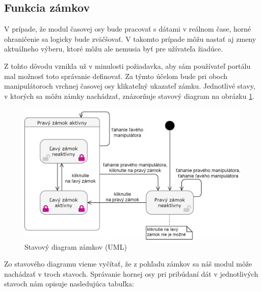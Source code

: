 \documentclass[
  digital, %
  twoside, %
  notable,   %
  nolof,   %
  nolot,   %
]{fithesis3}
\begin{document}
\subsection{Funkcia zámkov}
\label{sec:lockers}
V prípade, že modul časovej osy bude pracovať s dátami v reálnom čase, horné ohraničenie sa logicky bude zväčšovať. V takomto prípade môžu nastať aj zmeny aktuálneho výberu, ktoré môžu ale nemusia byť pre užívateľa žiadúce.

Z tohto dôvodu vznikla už v minulosti požiadavka, aby sám používateľ portálu mal možnosť toto správanie definovať. Za týmto účelom bude pri oboch manipulátoroch vrchnej časovej osy klikateľný ukazateľ zámku. Jednotlivé stavy, v ktorých sa môžu zámky nachádzať, znázorňuje stavový diagram na obrázku \ref{state_diagram}.

\begin{figure}[H]
	\center
	\includegraphics[width=1.0\linewidth]{state_diagram}
	\caption{Stavový diagram zámkov (UML)}
	\label{state_diagram}
\end{figure}

Zo stavového diagramu vieme vyčítať, že z pohľadu zámkov sa náš modul môže nachádzať v troch stavoch. Správanie hornej osy pri pribúdaní dát v jednotlivých stavoch nám opisuje nasledujúca tabuľka:
\end{document}
